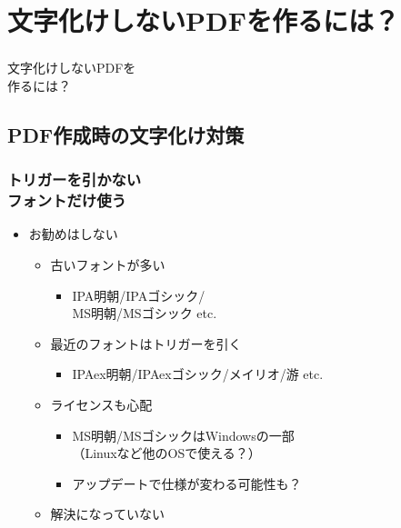 \section{文字化けしないPDFを作るには？}
\begin{frame}\frametitle{}
  \centering
  文字化けしないPDFを \\ 作るには？
\end{frame}

\subsection{PDF作成時の文字化け対策}
\begin{frame}\frametitle{トリガーを引かない \\ フォントだけ使う}
  \begin{itemize}
  \item お勧めはしない
    \begin{itemize}
    \item 古いフォントが多い
      \begin{itemize}
      \item IPA明朝/IPAゴシック/ \\ MS明朝/MSゴシック etc.
      \end{itemize}
    \item 最近のフォントはトリガーを引く
      \begin{itemize}
      \item IPAex明朝/IPAexゴシック/メイリオ/游 etc.
      \end{itemize}
    \item ライセンスも心配
      \begin{itemize}
      \item MS明朝/MSゴシックはWindowsの一部 \\
        （Linuxなど他のOSで使える？）
      \item アップデートで仕様が変わる可能性も？
      \end{itemize}
    \item 解決になっていない
    \end{itemize}
  \end{itemize}
\end{frame}

